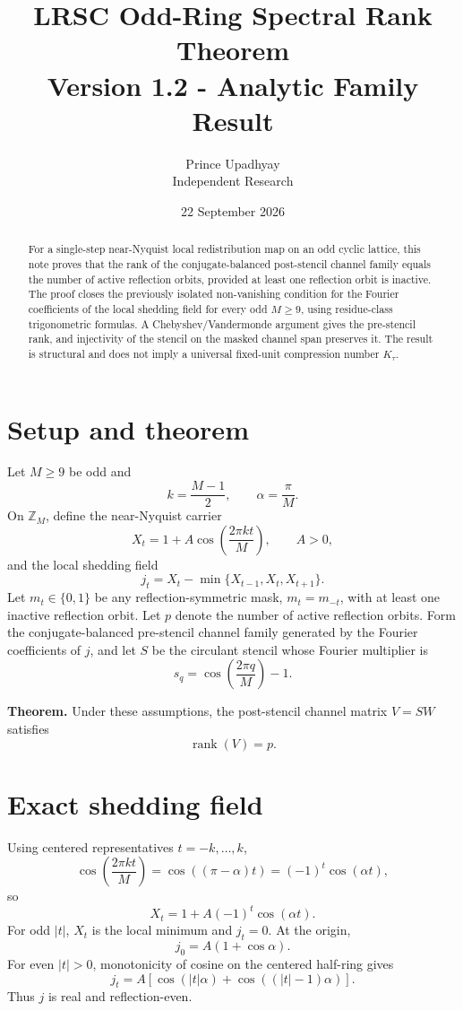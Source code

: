 \documentclass[11pt]{article}
\title{LRSC Odd-Ring Spectral Rank Theorem\\\large Version 1.2 - Analytic Family Result}
\author{Prince Upadhyay\\Independent Research}
\date{22 September 2026}
\begin{document}
\maketitle

\begin{abstract}
For a single-step near-Nyquist local redistribution map on an odd cyclic lattice, this note proves that the rank of the conjugate-balanced post-stencil channel family equals the number of active reflection orbits, provided at least one reflection orbit is inactive. The proof closes the previously isolated non-vanishing condition for the Fourier coefficients of the local shedding field for every odd $M\ge 9$, using residue-class trigonometric formulas. A Chebyshev/Vandermonde argument gives the pre-stencil rank, and injectivity of the stencil on the masked channel span preserves it. The result is structural and does not imply a universal fixed-unit compression number $K_\tau$.
\end{abstract}

\section{Setup and theorem}
Let $M\ge 9$ be odd and
\[
k=\frac{M-1}{2},\qquad \alpha=\frac{\pi}{M}.
\]
On $\mathbb Z_M$, define the near-Nyquist carrier
\[
X_t=1+A\cos\!\left(\frac{2\pi kt}{M}\right),\qquad A>0,
\]
and the local shedding field
\[
j_t=X_t-\min\{X_{t-1},X_t,X_{t+1}\}.
\]
Let $m_t\in\{0,1\}$ be any reflection-symmetric mask, $m_t=m_{-t}$, with at least one inactive reflection orbit. Let $p$ denote the number of active reflection orbits. Form the conjugate-balanced pre-stencil channel family generated by the Fourier coefficients of $j$, and let $S$ be the circulant stencil whose Fourier multiplier is
\[
s_q=\cos\!\left(\frac{2\pi q}{M}\right)-1.
\]

\textbf{Theorem.} Under these assumptions, the post-stencil channel matrix $V=SW$ satisfies
\[
\boxed{\operatorname{rank}(V)=p.}
\]

\section{Exact shedding field}
Using centered representatives $t=-k,\dots,k$,
\[
\cos\!\left(\frac{2\pi kt}{M}\right)=\cos((\pi-\alpha)t)=(-1)^t\cos(\alpha t),
\]
so
\[
X_t=1+A(-1)^t\cos(\alpha t).
\]
For odd $|t|$, $X_t$ is the local minimum and $j_t=0$. At the origin,
\[
j_0=A(1+\cos\alpha).
\]
For even $|t|>0$, monotonicity of cosine on the centered half-ring gives
\[
\boxed{j_t=A\left[\cos(|t|\alpha)+\cos((|t|-1)\alpha)\right].}
\]
Thus $j$ is real and reflection-even.
\end{document}
